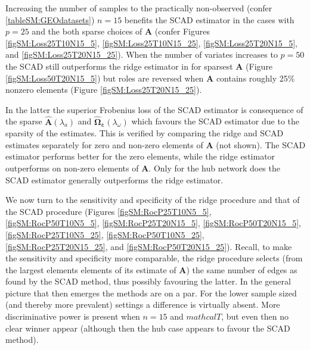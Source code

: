 \documentclass[a4paper]{article}
\begin{document}
Increasing the number of samples to the practically non-observed (confer \ref{tableSM:GEOdatasets}) $n=15$ benefits the SCAD estimator in the cases with $p=25$ and the both sparse choices of $\mathbf{A}$ (confer Figures \ref{figSM:Loss25T10N15_5}, \ref{figSM:Loss25T10N15_25}, \ref{figSM:Loss25T20N15_5}, and \ref{figSM:Loss25T20N15_25}). When the number of variates increases to $p=50$ the SCAD still outperforms the ridge estimator in for sparsest $\mathbf{A}$ (Figure \ref{figSM:Loss50T20N15_5}) but roles are reversed when $\mathbf{A}$ contains roughly 25\% nonzero elements (Figure \ref{figSM:Loss25T20N15_25}).

In the latter the superior Frobenius loss of the SCAD estimator is consequence of the sparse $\mathbf{\hat{A}}(\lambda_a)$ and $\boldsymbol{\hat{\Omega}_{\varepsilon}}(\lambda_{\omega})$ which favours the SCAD estimator due to the sparsity of the estimates. This is verified by comparing the ridge and SCAD estimates separately for zero and non-zero elements of $\mathbf{A}$ (not shown). The SCAD estimator performs better for the zero elements, while the ridge estimator outperforms on non-zero elements of $\mathbf{A}$. Only for the hub network does the SCAD estimator generally outperforms the ridge estimator.

We now turn to the sensitivity and specificity of the ridge procedure and that of the SCAD procedure (Figures 
\ref{figSM:RocP25T10N5_5}, \ref{figSM:RocP50T10N5_5},
\ref{figSM:RocP25T20N15_5}, \ref{figSM:RocP50T20N15_5},
\ref{figSM:RocP25T10N5_25}, \ref{figSM:RocP50T10N5_25},
\ref{figSM:RocP25T20N15_25}, and \ref{figSM:RocP50T20N15_25}). Recall, to make the sensitivity and specificity more comparable, the ridge procedure selects (from the largest elements elements of its estimate of $\mathbf{A}$) the same number of edges as found by the SCAD method, thus possibly favouring the latter. In the general picture that then emerges the methods are on a par. For the lower sample sized (and thereby more prevalent) settings a difference is virtually absent. More discriminative power is present when $n=15$ and $mathcal{T}$, but even then no clear winner appear (although then the hub case appears to favour the SCAD method).


\end{document}

